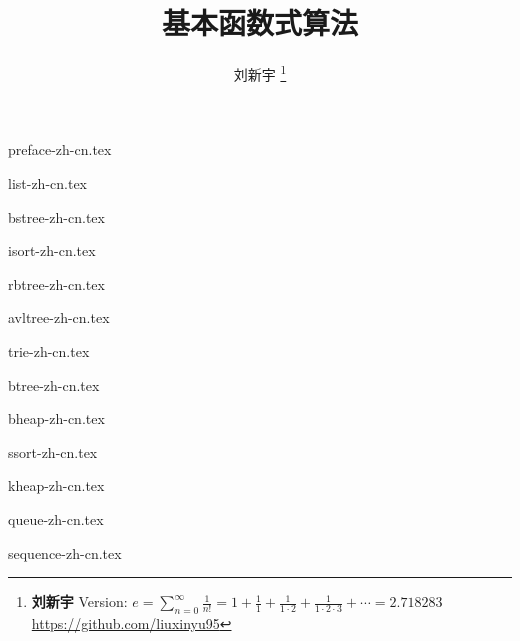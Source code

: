 \documentclass[zihao=5, b5paper, twoside, heading=true, punct=kaiming]{ctexbook}
\begin{document}


\title{
  {\bf \Huge 基本函数式算法}
  \centering
}

\author{刘新宇
  \thanks{{\bfseries 刘新宇} \newline
    Version: $\displaystyle e = \sum \limits _{n=0}^{\infty }{\frac {1}{n!}} = 1 + {\frac {1}{1}}+{\frac {1}{1\cdot 2}}+{\frac {1}{1\cdot 2\cdot 3}}+\cdots = 2.718283$ \newline
    \url{https://github.com/liuxinyu95} \newline
    }}

\maketitle

\frontmatter
{preface-zh-cn.tex}
\newpage

\tableofcontents

\mainmatter

{list-zh-cn.tex}

{bstree-zh-cn.tex}

{isort-zh-cn.tex}

{rbtree-zh-cn.tex}

{avltree-zh-cn.tex}

{trie-zh-cn.tex}

{btree-zh-cn.tex}

{bheap-zh-cn.tex}

{ssort-zh-cn.tex}

{kheap-zh-cn.tex}

{queue-zh-cn.tex}

{sequence-zh-cn.tex}
\end{document}
